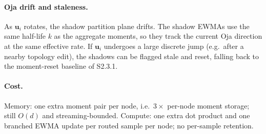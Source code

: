 \documentclass[11pt]{article}
\begin{document}
\paragraph{Oja drift and staleness.}
As $\mathbf u_i$ rotates, the shadow partition plane drifts. The shadow EWMAs use the same half-life $k$ as the aggregate moments, so they track the current Oja direction at the same effective rate. If $\mathbf u_i$ undergoes a large discrete jump (e.g.\ after a nearby topology edit), the shadows can be flagged stale and reset, falling back to the moment-reset baseline of S2.3.1.

\paragraph{Cost.}
Memory: one extra moment pair per node, i.e.\ $3\times$ per-node moment storage; still $O(d)$ and streaming-bounded. Compute: one extra dot product and one branched EWMA update per routed sample per node; no per-sample retention.
\end{document}
